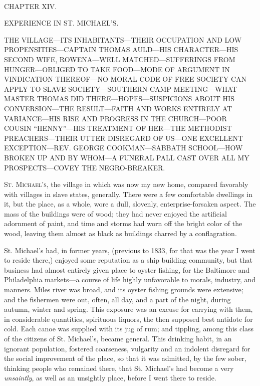 {\protect\hypertarget{185}{}{}}

~

{CHAPTER XIV.}

EXPERIENCE IN ST. MICHAEL'S.

{THE VILLAGE---ITS INHABITANTS---THEIR OCCUPATION AND LOW
PROPENSITIES---CAPTAIN THOMAS AULD---HIS CHARACTER---HIS SECOND WIFE,
ROWENA---WELL MATCHED---SUFFERINGS FROM HUNGER---OBLIGED TO TAKE
FOOD---MODE OF ARGUMENT IN VINDICATION THEREOF---NO MORAL CODE OF FREE
SOCIETY CAN APPLY TO SLAVE SOCIETY---SOUTHERN CAMP MEETING---WHAT MASTER
THOMAS DID THERE---HOPES---SUSPICIONS ABOUT HIS CONVERSION---THE
RESULT---FAITH AND WORKS ENTIRELY AT VARIANCE---HIS RISE AND PROGRESS IN
THE CHURCH---POOR COUSIN ``HENNY''---HIS TREATMENT OF HER---THE
METHODIST PREACHERS---THEIR UTTER DISREGARD OF US---ONE EXCELLENT
EXCEPTION---REV. GEORGE COOKMAN---SABBATH SCHOOL---HOW BROKEN UP AND BY
WHOM---A FUNERAL PALL CAST OVER ALL MY PROSPECTS---COVEY THE
NEGRO-BREAKER.}

\textsc{St. Michael's}, the village in which was now my new home,
compared favorably with villages in slave states, generally. There were
a few comfortable dwellings in it, but the place, as a whole, wore a
dull, slovenly, enterprise-forsaken aspect. The mass of the buildings
were of wood; they had never enjoyed the artificial adornment of paint,
and time and storms had worn off the bright color of the wood, leaving
them almost as black as buildings charred by a conflagration.

St. Michael's had, in former years, (previous to 1833, for that was the
year I went to reside there,) enjoyed some reputation as a ship building
community, but that business had almost entirely given place to oyster
fishing, for the Baltimore and Philadelphia markets---a course of life
highly unfavorable to morals, {\protect\hypertarget{186}{}{}}industry,
and manners. Miles river was broad, and its oyster fishing grounds were
extensive; and the fishermen were out, often, all day, and a part of the
night, during autumn, winter and spring. This exposure was an excuse for
carrying with them, in considerable quantities, spirituous liquors, the
then supposed best antidote for cold. Each canoe was supplied with its
jug of rum; and tippling, among this class of the citizens of St.
Michael's, became general. This drinking habit, in an ignorant
population, fostered coarseness, vulgarity and an indolent disregard for
the social improvement of the place, so that it was admitted, by the few
sober, thinking people who remained there, that St. Michael's had become
a very \emph{unsaintly}, as well as an unsightly place, before I went
there to reside.

